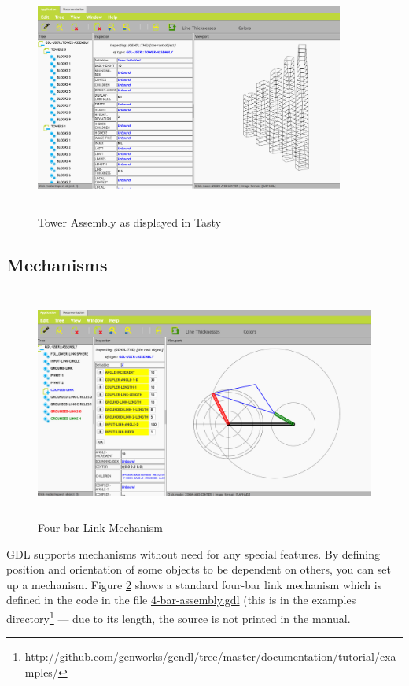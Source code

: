\documentclass [11pt]{book}
\begin{document}
\begin{figure}
\begin{center}
\includegraphics[width=4in,height=3in]{../images/tower-assembly-tasty.png}
\end{center}

\caption{Tower Assembly as displayed in Tasty}

\label{fig:tower-assembly-tasty}

\end{figure}


\subsection{Mechanisms}

\label{subsec:mechanisms}


\begin{figure}
\begin{center}
\includegraphics[width=5in,height=3in]{../images/4-bar-image.png}
\end{center}

\caption{Four-bar Link Mechanism}

\label{fig:4bar-image}

\end{figure}
GDL supports mechanisms without need for any special
features. By defining position and orientation of some objects to be
dependent on others, you can set up a mechanism. Figure 
\ref{fig:4bar-image} shows a standard four-bar link mechanism which is defined in the code in 
the file \href{run:../examples/4-bar-assembly.gdl}{4-bar-assembly.gdl} (this is in the examples directory\footnote{http://github.com/genworks/gendl/tree/master/documentation/tutorial/examples/} --- due to its length, the
     source is not printed in the manual.
\end{document}
